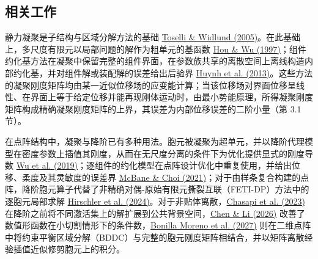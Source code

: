 \documentclass[preprint,12pt,authoryear]{elsarticle}
\begin{document}
\subsection{相关工作}

静力凝聚是子结构与区域分解方法的基础 \href{https://doi.org/10.1007/b137868}{Toselli \& Widlund (2005)}。在此基础上，多尺度有限元以局部问题的解作为粗单元的基函数 \href{https://doi.org/10.1006/jcph.1997.5682}{Hou \& Wu (1997)}；组件约化基方法在凝聚中保留完整的组件界面，在参数族共享的离散空间上离线构造内部约化基，并对组件解或装配解的误差给出后验界 \href{https://doi.org/10.1051/m2an/2012022}{Huynh et al. (2013)}。这些方法的凝聚刚度矩阵均由某一近似位移场的应变能计算；当该位移场对界面位移呈线性、在界面上等于给定位移并能再现刚体运动时，由最小势能原理，所得凝聚刚度矩阵构成精确凝聚刚度矩阵的上界，其误差为内部位移误差的二阶小量（第 3.1 节）。

在点阵结构中，凝聚与降阶已有多种用法。胞元被凝聚为超单元，并以降阶代理模型在密度参数上插值其刚度，从而在无尺度分离的条件下为优化提供显式的刚度导数 \href{https://doi.org/10.1016/j.cma.2018.11.003}{Wu et al. (2019)}；逐组件的约化模型在点阵设计优化中重复使用，并给出位移、柔度及其灵敏度的误差界 \href{https://doi.org/10.1016/j.cma.2021.113813}{McBane \& Choi (2021)}；对于由样条复合构建的点阵，降阶胞元算子代替了非精确对偶-原始有限元撕裂互联（FETI-DP）方法中的逐胞元局部求解 \href{https://doi.org/10.1002/nme.7419}{Hirschler et al. (2024)}。对于非贴体离散，\href{https://doi.org/10.1016/j.cma.2023.115997}{Chasapi et al. (2023)} 在降阶之前将不同激活集上的解扩展到公共背景空间，\href{https://doi.org/10.1016/j.cad.2026.104038}{Chen \& Li (2026)} 改善了数值形函数在小切割情形下的条件数，\href{https://doi.org/10.1016/j.cma.2026.119304}{Bonilla Moreno et al. (2027)} 则在二维点阵中将约束平衡区域分解（BDDC）与完整的胞元刚度矩阵相结合，并以矩阵离散经验插值近似修剪胞元上的积分。
\end{document}
